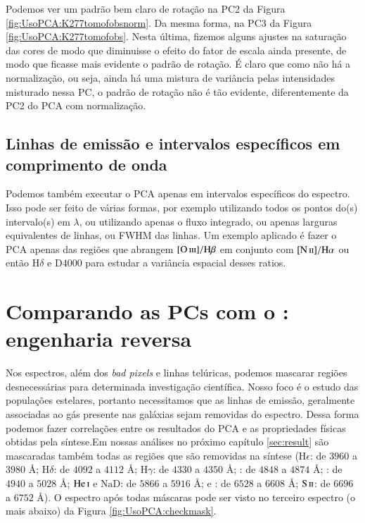 Podemos ver um padrão bem claro de rotação na PC2 da Figura \ref{fig:UsoPCA:K277tomofobsnorm}. Da mesma forma, na PC3 da
Figura \ref{fig:UsoPCA:K277tomofobs}. Nesta última, fizemos alguns ajustes na saturação das cores de modo que diminuisse
o efeito do fator de escala ainda presente, de modo que ficasse mais evidente o padrão de rotação. É claro que como não
há a normalização, ou seja, ainda há uma mistura de variância pelas intensidades misturado nessa PC, o padrão de rotação
não é tão evidente, diferentemente da PC2 do PCA com normalização.

\subsection{Linhas de emissão e intervalos específicos em comprimento de onda}
\label{sec:UsoPCA:PCAlidades:emlin}

Podemos também executar o PCA apenas em intervalos específicos do espectro. Isso pode ser feito de várias formas, por
exemplo utilizando todos os pontos do(s) intervalo(s) em $\lambda$, ou utilizando apenas o fluxo integrado, ou apenas
larguras equivalentes de linhas, ou FWHM das linhas. Um exemplo aplicado é fazer o PCA apenas das regiões que abrangem
$\oIII/\Hbeta$ em conjunto com $\nII/\Halpha$ ou então $\mathrm{H}\delta$ e D$4000$ para estudar a variância espacial
desses ratios.

\section{Comparando as PCs com o \starlight: engenharia reversa}
\label{sec:UsoPCA:EngRev}

Nos espectros, além dos {\em bad pixels} e linhas telúricas, podemos mascarar regiões desnecessárias para determinada
investigação científica. Nosso foco é o estudo das populações estelares, portanto necessitamos que as linhas de emissão,
geralmente associadas ao gás presente nas galáxias \fixme sejam removidas do espectro. Dessa forma podemos fazer
correlações entre os resultados do PCA e as propriedades físicas obtidas pela síntese.Em nossas análises no próximo
capítulo \ref{sec:result} são mascaradas também todas as regiões que são removidas na síntese ($\mathrm{H}\epsilon$: de
$3960$ a $3980$ \AA; $\mathrm{H}\delta$: de $4092$ a $4112$ \AA; $\mathrm{H}\gamma$: de $4330$ a $4350$ \AA; \Hbeta: de
$4848$ a $4874$ \AA; \oIII: de $4940$ a $5028$ \AA; $\mathrm{He\,\textsc{i}}$ e $\mathrm{NaD}$: de $5866$ a $5916$ \AA;
\Halpha e \nII: de $6528$ a $6608$ \AA; $\mathrm{S\,\textsc{ii}}$: de $6696$ a $6752$ \AA). O espectro após todas
máscaras pode ser visto no terceiro espectro (o mais abaixo) da Figura \ref{fig:UsoPCA:checkmask}.

